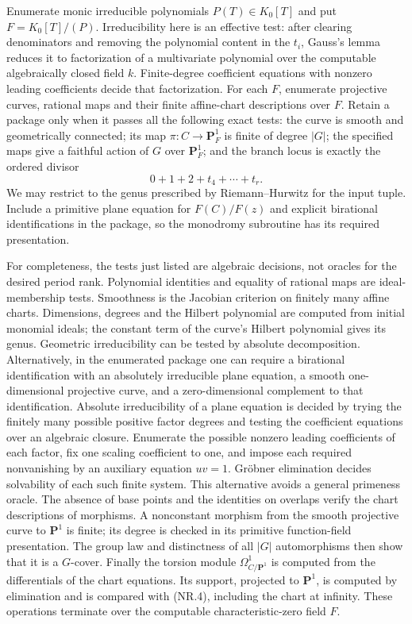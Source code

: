 Enumerate monic irreducible polynomials $P(T)\in K_0[T]$ and put
$F=K_0[T]/(P)$.  Irreducibility here is an effective test: after clearing
denominators and removing the polynomial content in the $t_i$, Gauss's
lemma reduces it to factorization of a multivariate polynomial over the
computable algebraically closed field $k$.  Finite-degree coefficient
equations with nonzero leading coefficients decide that factorization.
For each $F$, enumerate projective curves, rational maps
and their finite affine-chart descriptions over $F$.  Retain a package only
when it passes all the following exact tests: the curve is smooth and
geometrically connected; its map $\pi:C\to\mathbf P^1_F$ is finite of
degree $|G|$; the specified maps give a faithful action of $G$ over
$\mathbf P^1_F$; and the branch locus is exactly the ordered divisor
\[
                    0+1+2+t_4+\cdots+t_r.                    \tag{NR.4}
\]
We may restrict to the genus prescribed by Riemann--Hurwitz for the input
tuple.  Include a primitive plane equation for $F(C)/F(z)$ and explicit
birational identifications in the package, so the monodromy subroutine has
its required presentation.

For completeness, the tests just listed are algebraic decisions, not
oracles for the desired period rank.  Polynomial identities and equality
of rational maps are ideal-membership tests.  Smoothness is the Jacobian
criterion on finitely many affine charts.  Dimensions, degrees and the
Hilbert polynomial are computed from initial monomial ideals; the constant
term of the curve's Hilbert polynomial gives its genus.  Geometric
irreducibility can be tested by absolute decomposition.  Alternatively,
in the enumerated package one can require a birational identification with
an absolutely irreducible plane equation, a smooth one-dimensional
projective curve, and a zero-dimensional complement to that identification.
Absolute irreducibility of a plane equation is decided by trying the
finitely many possible positive factor degrees and testing the coefficient
equations over an algebraic closure.  Enumerate the possible nonzero
leading coefficients of each factor, fix one scaling coefficient to one,
and impose each required nonvanishing by an auxiliary equation $uv=1$.
Gr\"obner elimination decides solvability of each such finite system.
This alternative avoids a general primeness
oracle.  The absence of base points and the identities on overlaps verify
the chart descriptions of morphisms.  A nonconstant morphism from the
smooth projective curve to $\mathbf P^1$ is finite; its degree is checked
in its primitive function-field presentation.  The group law and
distinctness of all $|G|$ automorphisms then show that it is a $G$-cover.
Finally the torsion module $\Omega^1_{C/\mathbf P^1}$ is computed from
the differentials of the chart equations.  Its support, projected to
$\mathbf P^1$, is computed by elimination and is compared with (NR.4),
including the chart at infinity.  These operations terminate over the
computable characteristic-zero field $F$.

